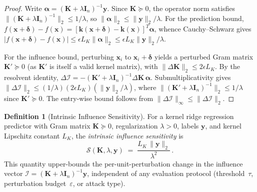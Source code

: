 \documentclass{article}
\theoremstyle{plain}
\theoremstyle{definition}
\newtheorem{definition}[theorem]{Definition}
\theoremstyle{remark}
\begin{document}
\begin{proof}
Write $\boldsymbol{\alpha} = (\mathbf{K}+\lambda\mathbf{I}_n)^{-1}\mathbf{y}$. Since $\mathbf{K} \succeq 0$, the operator norm satisfies $\|(\mathbf{K}+\lambda\mathbf{I}_n)^{-1}\|_2 \leq 1/\lambda$, so $\|\boldsymbol{\alpha}\|_2 \leq \|\mathbf{y}\|_2/\lambda$. For the prediction bound, $f(\mathbf{x}+\boldsymbol{\delta}) - f(\mathbf{x}) = [\mathbf{k}(\mathbf{x}+\boldsymbol{\delta}) - \mathbf{k}(\mathbf{x})]^T \boldsymbol{\alpha}$, whence Cauchy--Schwarz gives $|f(\mathbf{x}+\boldsymbol{\delta}) - f(\mathbf{x})| \leq \epsilon L_K \|\boldsymbol{\alpha}\|_2 \leq \epsilon L_K \|\mathbf{y}\|_2/\lambda$.

For the influence bound, perturbing $\mathbf{x}_i$ to $\mathbf{x}_i + \boldsymbol{\delta}$ yields a perturbed Gram matrix $\mathbf{K}' \succeq 0$ (as $\mathbf{K}'$ is itself a valid kernel matrix), with $\|\Delta\mathbf{K}\|_2 \leq 2\epsilon L_K$. By the resolvent identity, $\Delta\boldsymbol{\mathcal{I}} = -(\mathbf{K}'+\lambda\mathbf{I}_n)^{-1}\Delta\mathbf{K}\,\boldsymbol{\alpha}$. Submultiplicativity gives $\|\Delta\boldsymbol{\mathcal{I}}\|_2 \leq (1/\lambda)(2\epsilon L_K)(\|\mathbf{y}\|_2/\lambda)$, where $\|(\mathbf{K}'+\lambda\mathbf{I}_n)^{-1}\|_2 \leq 1/\lambda$ since $\mathbf{K}' \succeq 0$. The entry-wise bound follows from $\|\Delta\boldsymbol{\mathcal{I}}\|_\infty \leq \|\Delta\boldsymbol{\mathcal{I}}\|_2$.
\end{proof}

\begin{definition}[Intrinsic Influence Sensitivity]
\label{def:intrinsic_sensitivity}
For a kernel ridge regression predictor with Gram matrix $\mathbf{K} \succeq 0$, regularization $\lambda > 0$, labels $\mathbf{y}$, and kernel Lipschitz constant $L_K$, the \emph{intrinsic influence sensitivity} is
$$\mathcal{S}(\mathbf{K}, \lambda, \mathbf{y}) \;=\; \frac{L_K\,\|\mathbf{y}\|_2}{\lambda^2}\,.$$
This quantity upper-bounds the per-unit-perturbation change in the influence vector $\boldsymbol{\mathcal{I}} = (\mathbf{K}+\lambda\mathbf{I}_n)^{-1}\mathbf{y}$, independent of any evaluation protocol (threshold~$\tau$, perturbation budget~$\varepsilon$, or attack type).
\end{definition}
\end{document}
